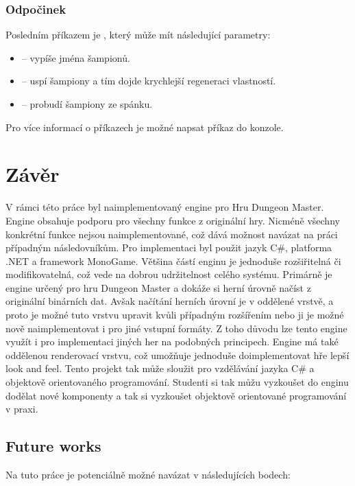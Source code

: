 \subsection{Odpočinek}
Posledním příkazem je , který může mít následující parametry:
\begin{itemize}
\item {} -- vypíše jména šampionů.
\item {} -- uspí šampiony a tím dojde krychlejší regeneraci vlastností.
\item {} -- probudí šampiony ze spánku. 
\end{itemize}

Pro více informací o příkazech je možné napsat příkaz  do konzole.

\chapter*{Závěr}

V rámci této práce byl naimplementovaný engine pro Hru Dungeon Master. Engine 
obsahuje podporu pro všechny funkce z originální hry. Nicméně všechny konkrétní funkce
nejsou naimplementované, což dává možnost navázat na práci případným následovníkům. 
Pro implementaci byl použit jazyk C\#, platforma .NET a framework MonoGame. 
Většina částí enginu je jednoduše rozšiřitelná či modifikovatelná, což vede 
na dobrou udržitelnost celého systému. Primárně je engine určený pro hru 
Dungeon Master a dokáže si herní úrovně načíst z originální binárních dat. Avšak 
načítání herních úrovní je v oddělené vrstvě, a proto je možné tuto vrstvu upravit kvůli případným 
rozšířením nebo ji je možné nově naimplementovat i pro jiné vstupní formáty.
Z toho důvodu lze tento engine využít i pro implementaci jiných her na podobných principech.
Engine má také oddělenou renderovací vrstvu, což umožňuje jednoduše doimplementovat hře lepší look and feel.
Tento projekt tak může sloužit pro vzdělávání jazyka C\# a objektově orientovaného programování. 
Studenti si tak můžu vyzkoušet do enginu dodělat nové komponenty a tak si vyzkoušet objektově 
orientované programování v praxi.

\section*{Future works}
Na tuto práce je potenciálně možné navázat v následujících bodech:

